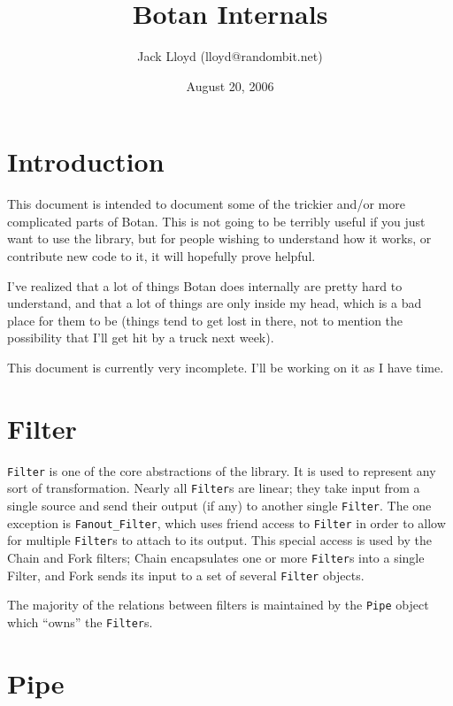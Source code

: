 \documentclass{article}
\title{Botan Internals}
\author{Jack Lloyd (lloyd@randombit.net)}
\date{August 20, 2006}
\newcommand{\type}[1]{\texttt{#1}}
\begin{document}
\maketitle

\tableofcontents

\parskip=5pt

\section{Introduction}

This document is intended to document some of the trickier and/or more
complicated parts of Botan. This is not going to be terribly useful if
you just want to use the library, but for people wishing to understand
how it works, or contribute new code to it, it will hopefully prove
helpful.

I've realized that a lot of things Botan does internally are pretty
hard to understand, and that a lot of things are only inside my head,
which is a bad place for them to be (things tend to get lost in there,
not to mention the possibility that I'll get hit by a truck next
week).

This document is currently very incomplete. I'll be working on it as I
have time.

\pagebreak

\section{Filter}

\type{Filter} is one of the core abstractions of the library. It is
used to represent any sort of transformation. Nearly all
\type{Filter}s are linear; they take input from a single source and
send their output (if any) to another single \type{Filter}. The one
exception is \type{Fanout\_Filter}, which uses friend access to
\type{Filter} in order to allow for multiple \type{Filter}s to attach
to its output. This special access is used by the Chain and Fork
filters; Chain encapsulates one or more \type{Filter}s into a single
Filter, and Fork sends its input to a set of several \type{Filter}
objects.

The majority of the relations between filters is maintained by the
\type{Pipe} object which ``owns'' the \type{Filter}s.

\section{Pipe}
\end{document}
